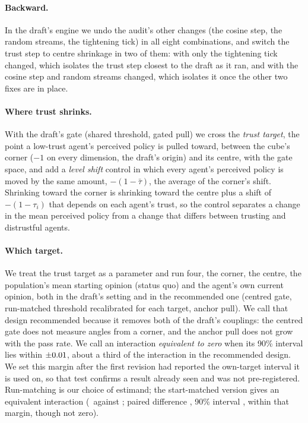 \documentclass[11pt]{article}
\begin{document}
\paragraph{Backward.} In the draft's engine we undo the audit's other changes (the cosine step, the random streams, the tightening tick) in all eight combinations, and switch the trust step to centre shrinkage in two of them: with only the tightening tick changed, which isolates the trust step closest to the draft as it ran, and with the cosine step and random streams changed, which isolates it once the other two fixes are in place.
\paragraph{Where trust shrinks.} With the draft's gate (shared threshold, gated pull) we cross the \emph{trust target}, the point a low-trust agent's perceived policy is pulled toward, between the cube's corner ($-1$ on every dimension, the draft's origin) and its centre, with the gate space, and add a \emph{level shift} control in which every agent's perceived policy is moved by the same amount, $-(1-\bar\tau)$, the average of the corner's shift.
Shrinking toward the corner is shrinking toward the centre plus a shift of $-(1-\tau_i)$ that depends on each agent's trust, so the control separates a change in the mean perceived policy from a change that differs between trusting and distrustful agents.
\paragraph{Which target.} We treat the trust target as a parameter and run four, the corner, the centre, the population's mean starting opinion (status quo) and the agent's own current opinion, both in the draft's setting and in the recommended one (centred gate, run-matched threshold recalibrated for each target, anchor pull).
We call that design recommended because it removes both of the draft's couplings: the centred gate does not measure angles from a corner, and the anchor pull does not grow with the pass rate.
We call an interaction \emph{equivalent to zero} when its 90\% interval lies within $\pm0.01$, about a third of the interaction in the recommended design. We set this margin after the first revision had reported the own-target interval it is used on, so that test confirms a result already seen and was not pre-registered.
Run-matching is our choice of estimand; the start-matched version gives an equivalent interaction (\VFCentredMatchedAnchorInter\ against \VFCentredRunAnchorInter; paired difference \VRunVsStartDiff, 90\% interval \VRunVsStartCI, within that margin, though not zero).
\end{document}
